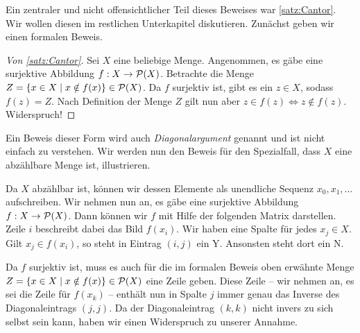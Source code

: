 Ein zentraler und nicht offensichtlicher Teil dieses Beweises war \autoref{satz:Cantor}.
Wir wollen diesen im restlichen Unterkapitel diskutieren.
Zunächst geben wir einen formalen Beweis.

\begin{proof}[Von \autoref{satz:Cantor}]
	Sei $X$ eine beliebige Menge.
	Angenommen, es gäbe eine surjektive Abbildung $f:X\rightarrow\mathcal{P}(X)$.
	Betrachte die Menge $Z=\{x\in X\mid x\notin f(x)\}\in\mathcal{P}(X)$.
	Da $f$ surjektiv ist, gibt es ein $z\in X$, sodass $f(z)=Z$.
	Nach Definition der Menge $Z$ gilt nun aber $z\in f(z)\Leftrightarrow z\notin f(z)$. Widerspruch!
\end{proof}

Ein Beweis dieser Form wird auch \emph{Diagonalargument} genannt und ist nicht einfach zu verstehen.
Wir werden nun den Beweis für den Spezialfall, dass $X$ eine abzählbare Menge ist, illustrieren.

Da $X$ abzählbar ist, können wir dessen Elemente als unendliche Sequenz $x_0,x_1,\ldots$ aufschreiben.
Wir nehmen nun an, es gäbe eine surjektive Abbildung $f:X\rightarrow\mathcal{P}(X)$.
Dann können wir $f$ mit Hilfe der folgenden Matrix darstellen.
Zeile $i$ beschreibt dabei das Bild $f(x_i)$. 
Wir haben eine Spalte für jedes $x_j\in X$.
Gilt $x_j\in f(x_i)$, so steht in Eintrag $(i,j)$ ein Y. Ansonsten steht dort ein N.

Da $f$ surjektiv ist, muss es auch für die im formalen Beweis oben erwähnte Menge $Z=\{x\in X\mid x\notin f(x)\}\in\mathcal{P}(X)$ eine Zeile geben.
Diese Zeile -- wir nehmen an, es sei die Zeile für $f(x_k)$ -- enthält nun in Spalte $j$ immer genau das Inverse des Diagonaleintrags $(j, j)$.
Da der Diagonaleintrag $(k,k)$ nicht invers zu sich selbst sein kann, haben wir einen Widerspruch zu unserer Annahme.



